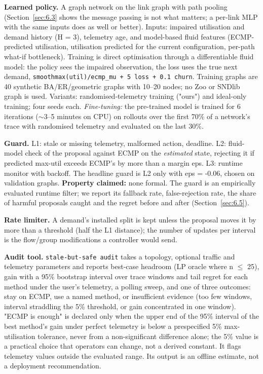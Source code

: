 \documentclass[journal]{IEEEtran}
\begin{document}
\textbf{Learned policy.} A graph network on the link graph with path pooling (Section~\ref{sec:6.3} shows the message passing is not what matters; a per-link MLP with the same inputs does as well or better). Inputs: impaired utilisation and demand history (H = 3), telemetry age, and model-based fluid features (ECMP-predicted utilisation, utilisation predicted for the current configuration, per-path what-if bottleneck). Training is direct optimisation through a differentiable fluid model: the policy sees the impaired observation, the loss uses the true next demand, \texttt{smoothmax(util)/ecmp\_mu + 5 loss + 0.1 churn}. Training graphs are 40 synthetic BA/ER/geometric graphs with 10--20 nodes; no Zoo or SNDlib graph is used. Variants: randomised-telemetry training ("ours") and ideal-only training; four seeds each. \textit{Fine-tuning:} the pre-trained model is trained for 6 iterations ($\sim$3--5 minutes on CPU) on rollouts over the first 70\% of a network's trace with randomised telemetry and evaluated on the last 30\%.

\textbf{Guard.} L1: stale or missing telemetry, malformed action, deadline. L2: fluid-model check of the proposal against ECMP on the \textit{estimated} state, rejecting it if predicted max-util exceeds ECMP's by more than a margin eps. L3: runtime monitor with backoff. The headline guard is L2 only with eps = -0.06, chosen on validation graphs. \textbf{Property claimed:} none formal. The guard is an empirically evaluated runtime filter; we report its fallback rate, false-rejection rate, the share of harmful proposals caught and the regret before and after (Section~\ref{sec:6.5}).

\textbf{Rate limiter.} A demand's installed split is kept unless the proposal moves it by more than a threshold (half the L1 distance); the number of updates per interval is the flow/group modifications a controller would send.

\textbf{Audit tool.} \texttt{stale-but-safe audit} takes a topology, optional traffic and telemetry parameters and reports best-case headroom (LP oracle where n $\le$ 25), gain with a 95\% bootstrap interval over trace windows and tail regret for each method under the user's telemetry, a polling sweep, and one of three outcomes: stay on ECMP, use a named method, or insufficient evidence (too few windows, interval straddling the 5\% threshold, or gain concentrated in one window). "ECMP is enough" is declared only when the upper end of the 95\% interval of the best method's gain under perfect telemetry is below a prespecified 5\% max-utilisation tolerance, never from a non-significant difference alone; the 5\% value is a practical choice that operators can change, not a derived constant. It flags telemetry values outside the evaluated range. Its output is an offline estimate, not a deployment recommendation.
\end{document}
